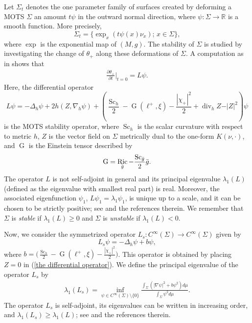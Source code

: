 \documentclass[a4paper, 11pt, reqno]{amsart}
\newcommand{\diver}{\operatorname{div}}
\DeclareMathOperator{\Ric}{Ric}
\newcommand{\Ein}{\operatorname{G}}
\newcommand{\s}{\operatorname{Sc}}
\begin{document}
 
 Let $\Sigma_t$ denotes the one parameter family of surfaces created by deforming a MOTS $\Sigma$ an amount $t\psi$ in the outward normal direction, where $\psi:\Sigma\to\mathbb{R}$ is a smooth function. More precisely,
 $$\Sigma_t=\{\exp_x(t\psi(x)\nu_x);\, x\in\Sigma\},$$
 where $\exp$ is the exponential map of $(M,g)$. The stability of $\Sigma$ is studied by investigating
the change of $\theta_+$ along these deformations of $\Sigma$. A computation as in \cite{AMS} shows that
 \begin{eqnarray*}
     \frac{\partial\theta_+}{\partial t}\bigg\vert_{t=0}=L\psi.
 \end{eqnarray*}
 Here, the differential operator
 \begin{equation}\label{the differential operator}
     L\psi=-\Delta_h\psi+2h(Z,\nabla_h\psi)+\left(\frac{\s_h}{2}-\Ein(\ell^{+},\xi)-\frac{|\chi_{+}|^2}{2}+\diver_{h} Z-\vert Z \vert^2\right)\psi
 \end{equation}
 is the MOTS stability operator, where $\s_h$ is the scalar curvature with respect to metric $h$, $Z$ is the vector field on $\Sigma$ metrically dual to the one-form $K(\nu,\cdot)$,
 and $\Ein$ is the Einstein tensor described by
 \begin{equation*}
     \Ein=\Ric_{\Bar{g}} -\frac{\s_{\Bar{g}}}{2}\Bar{g}.
 \end{equation*}
The operator $L$ is not self-adjoint in general and its principal eigenvalue $\lambda_1(L)$ (defined as the eigenvalue with smallest real part) is real. Moreover, the associated eigenfunction $\psi_1$, $L\psi_1=\lambda_1\psi_1$, is unique up to a scale, and it can be chosen to be strictly positive; see \cite{AMS} and the references therein.
We remember that $\Sigma$ is {\it{stable}} if $\lambda_1(L)\geq0$ and $\Sigma$ is {\it{unstable}} if $\lambda_1(L)<0$.

Now, we consider the symmetrized operator $L_s: C^{\infty}(\Sigma)\longrightarrow C^{\infty}(\Sigma)$ given by
\begin{equation*}
    L_s\psi=-\Delta_h\psi+b\psi,
\end{equation*}
where $b=\Big(\frac{\s_h}{2}-\Ein(\ell^+,\xi)-\frac{|\chi_{+}|^2}{2}\Big)$. This operator is obtained by placing $Z=0$ in (\ref{the differential operator}).  We define the principal eigenvalue of the operator $L_s$ by
\begin{eqnarray*}\label{principal eigenvalue}
    \lambda_1 (L_s)=\inf_{\psi \in C^{\infty}(\Sigma)\setminus\{0\}}\frac{\int_{\Sigma}(|\nabla\psi|^2+b\psi^2)d\mu}{\int_{\Sigma}\psi^2d\mu}.
\end{eqnarray*}
The operator $L_s$ is self-adjoint, its eigenvalues can be written in increasing order, and $\lambda_1(L_s)\geq\lambda_1(L)$; see \cite{AMS,Galloway,GS,M} and the references therein.
\end{document}
